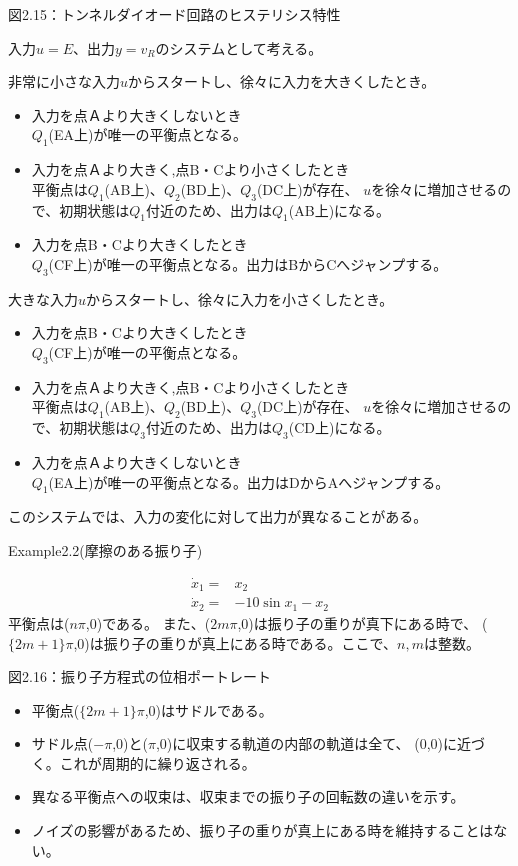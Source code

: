 \documentclass{jsarticle}
\begin{document}
図2.15：トンネルダイオード回路のヒステリシス特性

入力$u=E$、出力$y=v_R$のシステムとして考える。

非常に小さな入力$u$からスタートし、徐々に入力を大きくしたとき。
\begin{itemize}
  \item 入力を点Ａより大きくしないとき\\
  $Q_1$(EA上)が唯一の平衡点となる。
  \item 入力を点Ａより大きく,点B・Cより小さくしたとき\\
  平衡点は$Q_1$(AB上)、$Q_2$(BD上)、$Q_3$(DC上)が存在、
  $u$を徐々に増加させるので、初期状態は$Q_1$付近のため、出力は$Q_1$(AB上)になる。
  \item 入力を点B・Cより大きくしたとき\\
  $Q_3$(CF上)が唯一の平衡点となる。出力はBからCへジャンプする。
\end{itemize}
大きな入力$u$からスタートし、徐々に入力を小さくしたとき。
\begin{itemize}
  \item 入力を点B・Cより大きくしたとき\\
  $Q_3$(CF上)が唯一の平衡点となる。
  \item 入力を点Ａより大きく,点B・Cより小さくしたとき\\
  平衡点は$Q_1$(AB上)、$Q_2$(BD上)、$Q_3$(DC上)が存在、
  $u$を徐々に増加させるので、初期状態は$Q_3$付近のため、出力は$Q_3$(CD上)になる。
  \item 入力を点Ａより大きくしないとき\\
  $Q_1$(EA上)が唯一の平衡点となる。出力はDからAへジャンプする。
\end{itemize}
このシステムでは、入力の変化に対して出力が異なることがある。

Example2.2(摩擦のある振り子)

\begin{align*}
  \dot x_1 = & x_2\\
  \dot x_2 = & -10\sin x_1 - x_2
\end{align*}
平衡点は($n\pi$,0)である。
また、($2m\pi$,0)は振り子の重りが真下にある時で、
($\{2m+1\}\pi$,0)は振り子の重りが真上にある時である。ここで、$n,m$は整数。

図2.16：振り子方程式の位相ポートレート
\begin{itemize}
  \item 平衡点($\{2m+1\}\pi$,0)はサドルである。
  \item サドル点($-\pi$,0)と($\pi$,0)に収束する軌道の内部の軌道は全て、
  (0,0)に近づく。これが周期的に繰り返される。
  \item 異なる平衡点への収束は、収束までの振り子の回転数の違いを示す。
  \item ノイズの影響があるため、振り子の重りが真上にある時を維持することはない。
\end{itemize}
\end{document}
